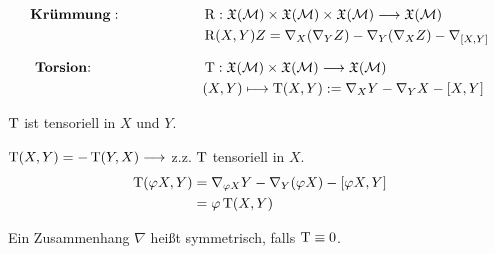 \begin{align*}
\text{\textbf{Krümmung}}: \qquad\qquad\qquad &\operatorname{R}: \mathfrak{X}(\mathcal{M}) \times \mathfrak{X}(\mathcal{M}) \times \mathfrak{X}(\mathcal{M}) \longrightarrow \mathfrak{X}(\mathcal{M}) \\
&\operatorname{R}(X,Y)Z = \nabla_X(\nabla_YZ) - \nabla_Y(\nabla_XZ) - \nabla_{[X,Y]}
\end{align*}

\begin{align*}
\text{\textbf{Torsion}:} \qquad\qquad\qquad\qquad &\operatorname{T}: \mathfrak{X}(\mathcal{M}) \times \mathfrak{X}(\mathcal{M}) \longrightarrow \mathfrak{X}(\mathcal{M}) \\
&(X,Y) \longmapsto \operatorname{T}(X,Y) := \nabla_XY -\nabla_YX - [X,Y]
\end{align*}
\begin{lem}
$\operatorname{T}$ ist tensoriell in $X$ und $Y$.
\begin{bew}
$\operatorname{T}(X,Y) = -\operatorname{T}(Y,X)  \longrightarrow$ z.z. $\operatorname{T}$ tensoriell in $X$. 
\begin{align*}
\operatorname{T}(\varphi X,Y) &= \nabla_{\varphi X}Y -  \nabla_Y(\varphi X) - [\varphi X,Y] \\
						&= \varphi\operatorname{T}(X,Y)
\end{align*}
\end{bew}
\end{lem}

\begin{defs}
Ein Zusammenhang $\nabla$ heißt symmetrisch, falls $\operatorname{T} \equiv 0$.
\end{defs}


